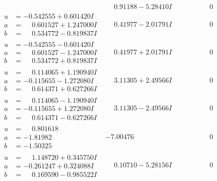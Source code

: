 \documentclass[1p]{elsarticle_modified}
\theoremstyle{definition}
\begin{document}
$$\begin{array}{c|c|c}
 & \phantom{-}0.91188 - 5.28410 I & \phantom{-0.000000 } 0 \\ \hline\begin{aligned}
u &= -0.542555 + 0.601420 I \\
a &= \phantom{-}0.601527 + 1.247000 I \\
b &= \phantom{-}0.534772 - 0.819837 I\end{aligned}
 & \phantom{-}0.41977 - 2.01791 I & \phantom{-0.000000 } 0 \\ \hline\begin{aligned}
u &= -0.542555 - 0.601420 I \\
a &= \phantom{-}0.601527 - 1.247000 I \\
b &= \phantom{-}0.534772 + 0.819837 I\end{aligned}
 & \phantom{-}0.41977 + 2.01791 I & \phantom{-0.000000 } 0 \\ \hline\begin{aligned}
u &= \phantom{-}0.114065 + 1.190940 I \\
a &= -0.115655 - 1.272080 I \\
b &= \phantom{-}0.614371 + 0.627266 I\end{aligned}
 & \phantom{-}3.11305 + 2.49566 I & \phantom{-0.000000 } 0 \\ \hline\begin{aligned}
u &= \phantom{-}0.114065 - 1.190940 I \\
a &= -0.115655 + 1.272080 I \\
b &= \phantom{-}0.614371 - 0.627266 I\end{aligned}
 & \phantom{-}3.11305 - 2.49566 I & \phantom{-0.000000 } 0 \\ \hline\begin{aligned}
u &= \phantom{-}0.801618\phantom{ +0.000000I} \\
a &= -1.81982\phantom{ +0.000000I} \\
b &= -1.50325\phantom{ +0.000000I}\end{aligned}
 & -7.00476\phantom{ +0.000000I} & \phantom{-0.000000 } 0 \\ \hline\begin{aligned}
u &= \phantom{-}1.148720 + 0.345750 I \\
a &= -0.261247 + 0.324088 I \\
b &= \phantom{-}0.169590 - 0.985522 I\end{aligned}
 & \phantom{-}0.10710 - 5.28156 I & \phantom{-0.000000 } 0 \\ \hline\begin{aligned}

\end{aligned}
\end{array}$$
\end{document}
